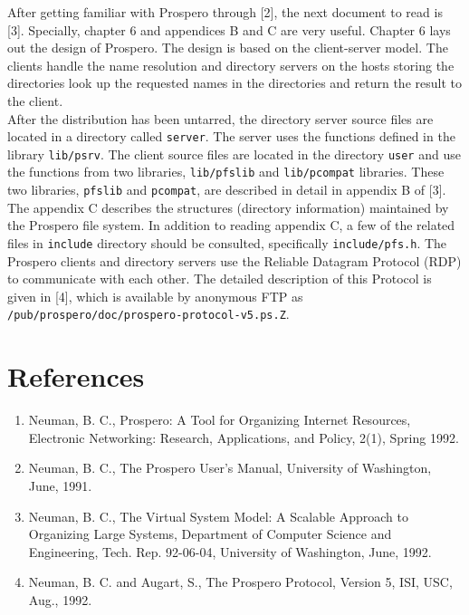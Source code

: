 	After getting familiar with Prospero through [2], the next document to read is [3]. Specially, chapter 6 and appendices B and C are very useful. Chapter 6 lays out the design of Prospero. The design is based on the client-server model. The clients handle the name resolution and directory servers on the hosts storing the directories look up the requested names in the directories and return the result to the client. \\

	After the distribution has been untarred, the directory server source files are located in a directory called {\tt server}. The server uses the functions defined in the library {\tt lib/psrv}. The client source files are located in the directory {\tt user} and use the functions from two libraries,  {\tt lib/pfslib} and {\tt lib/pcompat} libraries. These two libraries, {\tt pfslib} and {\tt pcompat}, are described in detail in appendix B of [3].  The appendix C describes the structures (directory information) maintained by the Prospero file system. In addition to reading appendix C, a few of the related files in {\tt include} directory should be consulted, specifically {\tt include/pfs.h}. The Prospero clients and directory servers use the Reliable Datagram Protocol (RDP) to communicate with each other. The detailed description of this Protocol is given in [4], which is available by
 anonymous FTP as {\tt /pub/prospero/doc/prospero-protocol-v5.ps.Z}. \\

\section* {References}
\begin{enumerate}
\item Neuman, B. C., Prospero: A Tool for Organizing Internet Resources, 
Electronic Networking: Research, Applications, and Policy, 2(1), Spring 1992.

\item
Neuman, B. C., The Prospero User's Manual, University of Washington, June, 1991.

\item
Neuman, B. C., The Virtual System Model: A Scalable Approach to Organizing 
Large Systems,  Department of Computer Science and Engineering, Tech. 
Rep. 92-06-04, University of Washington, June, 1992.

\item
Neuman, B. C. and Augart, S., The Prospero Protocol, Version 5, ISI, USC,  
Aug., 1992.
\end{enumerate}





